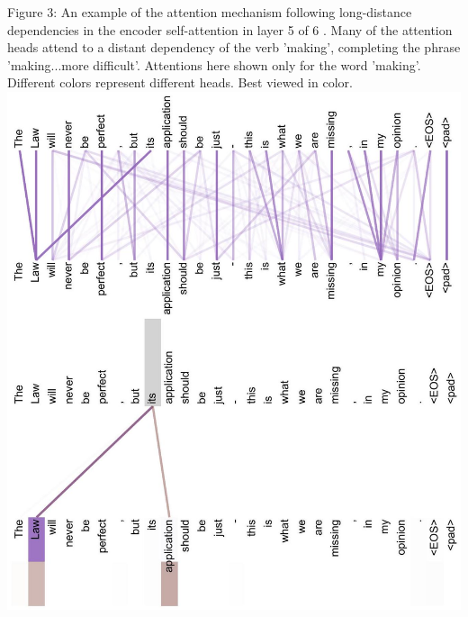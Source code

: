 \documentclass[10pt]{article}
\begin{document}
Figure 3: An example of the attention mechanism following long-distance dependencies in the encoder self-attention in layer 5 of 6 . Many of the attention heads attend to a distant dependency of the verb 'making', completing the phrase 'making...more difficult'. Attentions here shown only for the word 'making'. Different colors represent different heads. Best viewed in color.\\
\includegraphics[max width=\textwidth, center]{2024_11_26_e9e27627ef2b75478aaag-14}
\end{document}
